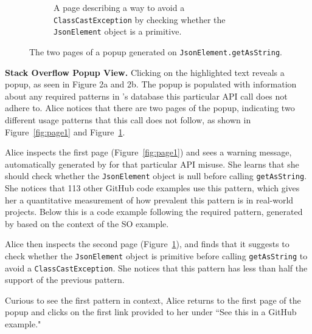 \begin{figure}
\begin{subfigure}[c]{0.48\textwidth}
  \caption{A page describing a way to avoid a {\tt ClassCastException} by checking whether the {\tt JsonElement} object is a primitive.}
  \vspace{.1in}
  \label{fig:page2}
  \end{subfigure}
  \hfill
  \caption{The two pages of a popup generated on {\tt JsonElement.getAsString}.}
\label{fig:features}
\end{figure}

{\bf Stack Overflow Popup View.}
Clicking on the highlighted text reveals a popup, as seen in Figure 2a and 2b. The popup is populated with information about any required patterns in {\soa}'s database this particular API call does not adhere to. Alice notices that there are two pages of the popup, indicating two different usage patterns that this call does not follow, as shown in Figure~\ref{fig:page1} and Figure~\ref{fig:page2}. 

Alice inspects the first page (Figure~\ref{fig:page1}) and sees a warning message, automatically generated by {\soa} for that particular API misuse. She learns that she should check whether the {\tt JsonElement} object is null before calling {\tt getAsString}. She notices that 113 other GitHub code examples use this pattern, which gives her a quantitative measurement of how prevalent this pattern is in real-world projects. Below this is a code example following the required pattern, generated by {\soa} based on the context of the SO example.

Alice then inspects the second page (Figure~\ref{fig:page2}), and finds that it suggests to check whether the {\tt JsonElement} object is primitive before calling {\tt getAsString} to avoid a {\tt ClassCastException}. She notices that this pattern has less than half the support of the previous pattern.

Curious to see the first pattern in context, Alice returns to the first page of the popup and clicks on the first link provided to her under ``See this in a GitHub example."

